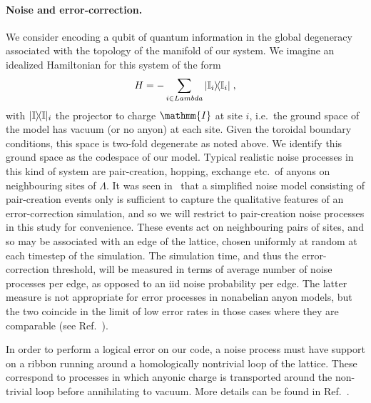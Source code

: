 \documentclass[aps, prl, letterpaper, twocolumn, superscriptaddress, notitlepage, 10pt]{revtex4-1}
\begin{document}
\paragraph{Noise and error-correction.}

	We consider encoding a qubit of quantum information in the global degeneracy associated with the topology of the manifold of our system. We imagine an idealized Hamiltonian for this system of the form
	\begin{align}
		H=-\sum_{i\in Lambda}|{\mathbb{I}_i}\rangle\!\langle{\mathbb{I}_i}|\;,\label{e:hamiltonian}
	\end{align}
with $|{\mathbb{I}}\rangle\!\langle{\mathbb{I}}|_i$ the projector to charge $\mathmm{I}$ at site $i$, i.e.~the ground space of the model has vacuum (or no anyon) at each site. Given the toroidal boundary conditions, this space is two-fold degenerate as noted above. We identify this ground space as the codespace of our model. Typical realistic noise processes in this kind of system are pair-creation, hopping, exchange etc.~of anyons on neighbouring sites of $\Lambda$. It was seen in~\cite{Brell2013} that a simplified noise model consisting of pair-creation events only is sufficient to capture the qualitative features of an error-correction simulation, and so we will restrict to pair-creation noise processes in this study for convenience. These events act on neighbouring pairs of sites, and so may be associated with an edge of the lattice, chosen uniformly at random at each timestep of the simulation. The simulation time, and thus the error-correction threshold, will be measured in terms of average number of noise processes per edge, as opposed to an iid noise probability per edge. The latter measure is not appropriate for error processes in nonabelian anyon models, but the two coincide in the limit of low error rates in those cases where they are comparable (see Ref.~\cite{Brell2013}).

	In order to perform a logical error on our code, a noise process must have support on a ribbon running around a homologically nontrivial loop of the lattice. These correspond to processes in which anyonic charge is transported around the non-trivial loop before annihilating to vacuum. More details can be found in Ref.~\cite{?}.
\end{document}
